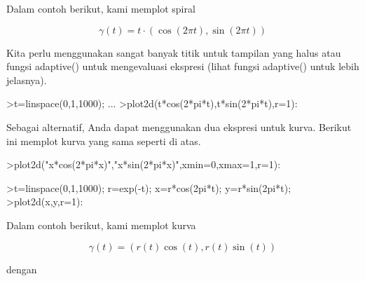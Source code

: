 \documentclass{article}
\begin{document}
\begin{eulernotebook}
\begin{eulercomment}
\begin{eulercomment}
\begin{eulercomment}
\begin{eulercomment}
\begin{eulercomment}
\begin{eulercomment}
\begin{eulercomment}
\begin{eulercomment}
\begin{eulercomment}
Dalam contoh berikut, kami memplot spiral

\end{eulercomment}
\begin{eulerformula}
\[
\gamma(t) = t \cdot (\cos(2\pi t),\sin(2\pi t))
\]
\end{eulerformula}
\begin{eulercomment}
Kita perlu menggunakan sangat banyak titik untuk tampilan yang halus
atau fungsi adaptive() untuk mengevaluasi ekspresi (lihat fungsi
adaptive() untuk lebih jelasnya).
\end{eulercomment}
\begin{eulerprompt}
>t=linspace(0,1,1000); ...
>plot2d(t*cos(2*pi*t),t*sin(2*pi*t),r=1):
\end{eulerprompt}
\begin{eulercomment}
Sebagai alternatif, Anda dapat menggunakan dua ekspresi untuk kurva.
Berikut ini memplot kurva yang sama seperti di atas.
\end{eulercomment}
\begin{eulerprompt}
>plot2d("x*cos(2*pi*x)","x*sin(2*pi*x)",xmin=0,xmax=1,r=1):
\end{eulerprompt}
\begin{eulerprompt}
>t=linspace(0,1,1000); r=exp(-t); x=r*cos(2pi*t); y=r*sin(2pi*t);
>plot2d(x,y,r=1):
\end{eulerprompt}
\begin{eulercomment}
Dalam contoh berikut, kami memplot kurva

\end{eulercomment}
\begin{eulerformula}
\[
\gamma(t) = (r(t) \cos(t), r(t) \sin(t))
\]
\end{eulerformula}
\begin{eulercomment}
dengan


\end{eulercomment}
\end{eulercomment}
\end{eulercomment}
\end{eulercomment}
\end{eulercomment}
\end{eulercomment}
\end{eulercomment}
\end{eulercomment}
\end{eulercomment}
\end{eulernotebook}
\end{document}
